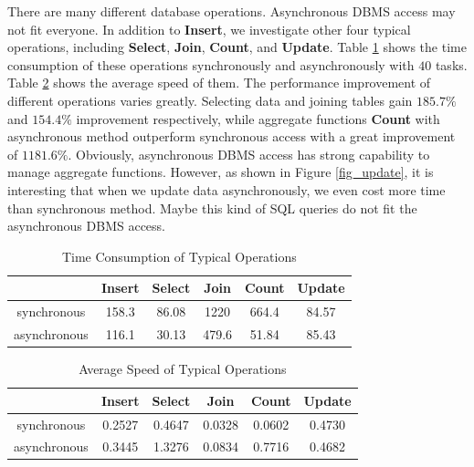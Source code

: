 \documentclass[onecolumn, conference, 12pt]{IEEEtran}
\begin{document}
	There are many different database operations. Asynchronous DBMS access may not fit everyone. In addition to \textbf{Insert}, we investigate other four typical operations, including \textbf{Select}, \textbf{Join}, \textbf{Count}, and \textbf{Update}. Table \ref{T1} shows the time consumption of these operations synchronously and asynchronously with $ 40 $ tasks. Table \ref{T2} shows the average speed of them. The performance improvement of different operations varies greatly. Selecting data and joining tables gain $ 185.7\% $ and $ 154.4\% $ improvement respectively, while aggregate functions \textbf{Count} with asynchronous method outperform synchronous access with a great improvement of $ 1181.6\% $. Obviously, asynchronous DBMS access has strong capability to manage aggregate functions. However, as shown in Figure \ref{fig_update}, it is interesting that when we update data asynchronously, we even cost more time than synchronous method. Maybe this kind of SQL queries do not fit the asynchronous DBMS access.
	
	\begin{table}
		\centering
		\caption{Time Consumption of Typical Operations}
		\begin{tabular}{|c|c|c|c|c|c|}
			\hline
			& Insert & Select & Join & Count & Update\\
			\hline
			synchronous & 158.3 & 86.08 & 1220 & 664.4 & 84.57\\
			\hline
			asynchronous & 116.1 & 30.13 & 479.6 & 51.84 & 85.43\\
			\hline
		\end{tabular}
		\label{T1}
	\end{table}
	
	\begin{table}
		\centering
		\caption{Average Speed of Typical Operations}
		\begin{tabular}{|c|c|c|c|c|c|}
			\hline
			& Insert & Select & Join & Count & Update\\
			\hline
			synchronous & 0.2527 & 0.4647 & 0.0328 & 0.0602 & 0.4730\\
			\hline
			asynchronous & 0.3445 & 1.3276 & 0.0834 & 0.7716 & 0.4682\\
			\hline
		\end{tabular}
		\label{T2}
	\end{table}
	
\end{document}
